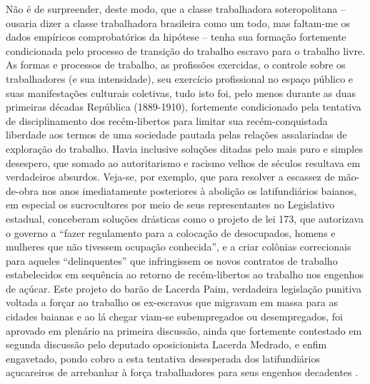 Não é de surpreender, deste modo, que a classe trabalhadora soteropolitana -- ousaria dizer a classe trabalhadora brasileira como um todo, mas faltam-me os dados empíricos comprobatórios da hipótese -- tenha sua formação fortemente condicionada pelo processo de transição do trabalho escravo para o trabalho livre. As formas e processos de trabalho, as profissões exercidas, o controle sobre os trabalhadores (e sua intensidade), seu exercício profissional no espaço público e suas manifestações culturais coletivas, tudo isto foi, pelo menos durante as duas primeiras décadas República (1889-1910), fortemente condicionado pela tentativa de disciplinamento dos recém-libertos para limitar sua recém-conquistada liberdade aos termos de uma sociedade pautada pelas relações assalariadas de exploração do trabalho. Havia inclusive soluções ditadas pelo mais puro e simples desespero, que somado ao autoritarismo e racismo velhos de séculos resultava em verdadeiros absurdos. Veja-se, por exemplo, que para resolver a escassez de mão-de-obra nos anos imediatamente posteriores à abolição os latifundiários baianos, em especial os sucrocultores por meio de seus representantes no Legislativo estadual, conceberam soluções drásticas como o projeto de lei 173, que autorizava o governo a ``fazer regulamento para a colocação de desocupados, homens e mulheres que não tivessem ocupação conhecida'', e a criar colônias correcionais para aqueles ``delinquentes'' que infringissem os novos contratos de trabalho estabelecidos em sequência ao retorno de recém-libertos ao trabalho nos engenhos de açúcar. Este projeto do barão de Lacerda Paim, verdadeira legislação punitiva voltada a forçar ao trabalho os ex-escravos que migravam em massa para as cidades baianas e ao lá chegar viam-se subempregados ou desempregados, foi aprovado em plenário na primeira discussão, ainda que fortemente contestado em segunda discussão pelo deputado oposicionista Lacerda Medrado, e enfim engavetado, pondo cobro a esta tentativa desesperada dos latifundiários açucareiros de arrebanhar à força trabalhadores para seus engenhos decadentes \cite[pp.~73-74]{sampaio_legislativo_1985}.

